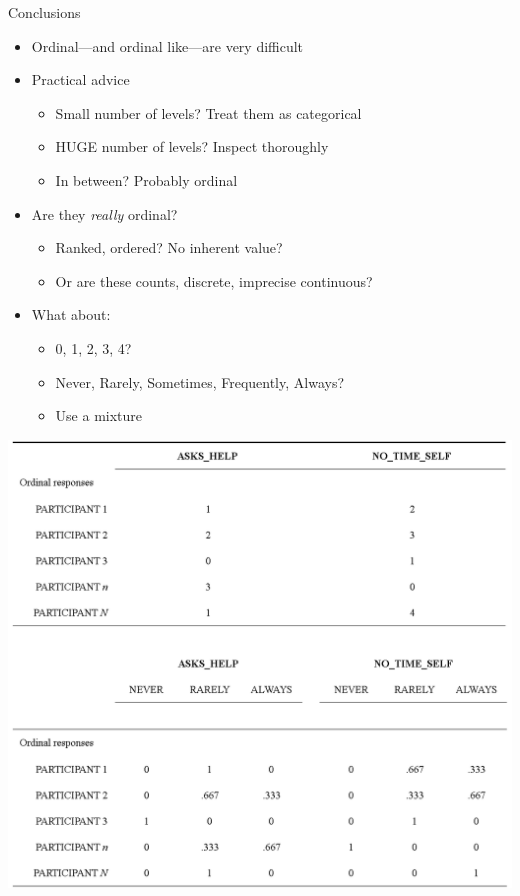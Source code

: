 \documentclass[
  ignorenonframetext,
]{beamer}
\providecommand{\tightlist}{%
  \setlength{\itemsep}{0pt}\setlength{\parskip}{0pt}}
\begin{document}
\begin{frame}{Conclusions}
\protect\hypertarget{conclusions-1}{}

\begin{itemize}[<+->]
\tightlist
\item
  Ordinal---and ordinal like---are very difficult
\item
  Practical advice

  \begin{itemize}[<+->]
  \tightlist
  \item
    Small number of levels? Treat them as categorical
  \item
    HUGE number of levels? Inspect thoroughly
  \item
    In between? Probably ordinal
  \end{itemize}
\item
  Are they \emph{really} ordinal?

  \begin{itemize}[<+->]
  \tightlist
  \item
    Ranked, ordered? No inherent value?
  \item
    Or are these counts, discrete, imprecise continuous?
  \end{itemize}
\item
  What about:

  \begin{itemize}[<+->]
  \tightlist
  \item
    0, 1, 2, 3, 4?
  \item
    Never, Rarely, Sometimes, Frequently, Always?
  \item
    Use a mixture
  \end{itemize}
\end{itemize}

\end{frame}

\begin{frame}

\includegraphics{../images/Fuzzy_Crisp_Mix.PNG}

\end{frame}
\end{document}
